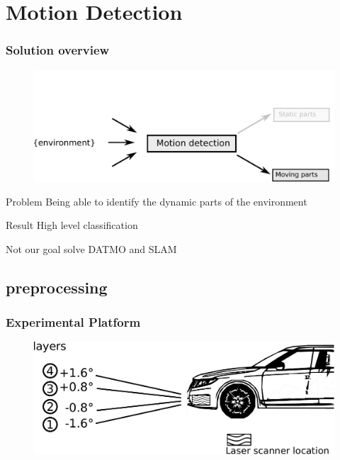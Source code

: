 \documentclass{beamer}
\begin{document}
\section{Motion Detection}

	\begin{frame}
		\frametitle{Solution overview}
		\begin{figure}[h]
			\center
			\includegraphics[scale=0.5]{img/fig:problem}
		 \end{figure}
		 
		\begin{block}{Problem}
			 Being able to identify the dynamic parts of the environment
		\end{block}
		 
		\begin{block}{Result}
			High level classification
		\end{block}				 

		\begin{alertblock}{Not our goal}
			solve DATMO and SLAM
		\end{alertblock}
	\end{frame}

\subsection{preprocessing}

	\begin{frame}
		\frametitle{Experimental Platform}
		\begin{figure}[h]
			\center
			\includegraphics[scale=0.4]{../img/fig:demonstrator:lateral}
		\end{figure}
	\end{frame}
\end{document}
